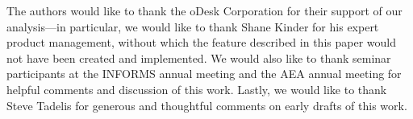 \documentclass[prodmode,acmec]{ec-acmsmall}
\begin{document}
\newpage


\newpage


\newpage 
\begin{acks}
  The authors would like to thank the oDesk Corporation for their support of our analysis---in particular, we would like to thank Shane Kinder for his expert product management, without which the feature described in this paper would not have been created and implemented.
  We would also like to thank seminar participants at the INFORMS annual meeting and the AEA annual meeting for helpful comments and discussion of this work. 
  Lastly, we would like to thank Steve Tadelis for generous and thoughtful comments on early drafts of this work. 
\end{acks}
\end{document}
